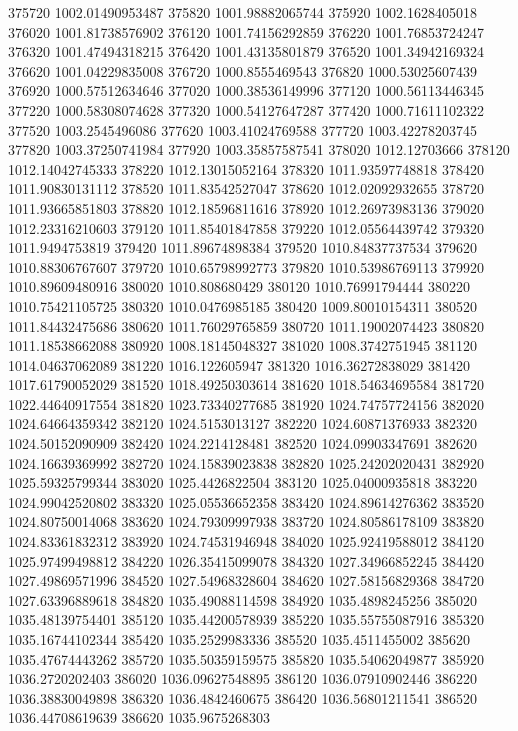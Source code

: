 {375720 1002.01490953487
375820 1001.98882065744
375920 1002.1628405018
376020 1001.81738576902
376120 1001.74156292859
376220 1001.76853724247
376320 1001.47494318215
376420 1001.43135801879
376520 1001.34942169324
376620 1001.04229835008
376720 1000.8555469543
376820 1000.53025607439
376920 1000.57512634646
377020 1000.38536149996
377120 1000.56113446345
377220 1000.58308074628
377320 1000.54127647287
377420 1000.71611102322
377520 1003.2545496086
377620 1003.41024769588
377720 1003.42278203745
377820 1003.37250741984
377920 1003.35857587541
378020 1012.12703666
378120 1012.14042745333
378220 1012.13015052164
378320 1011.93597748818
378420 1011.90830131112
378520 1011.83542527047
378620 1012.02092932655
378720 1011.93665851803
378820 1012.18596811616
378920 1012.26973983136
379020 1012.23316210603
379120 1011.85401847858
379220 1012.05564439742
379320 1011.9494753819
379420 1011.89674898384
379520 1010.84837737534
379620 1010.88306767607
379720 1010.65798992773
379820 1010.53986769113
379920 1010.89609480916
380020 1010.808680429
380120 1010.76991794444
380220 1010.75421105725
380320 1010.0476985185
380420 1009.80010154311
380520 1011.84432475686
380620 1011.76029765859
380720 1011.19002074423
380820 1011.18538662088
380920 1008.18145048327
381020 1008.3742751945
381120 1014.04637062089
381220 1016.122605947
381320 1016.36272838029
381420 1017.61790052029
381520 1018.49250303614
381620 1018.54634695584
381720 1022.44640917554
381820 1023.73340277685
381920 1024.74757724156
382020 1024.64664359342
382120 1024.5153013127
382220 1024.60871376933
382320 1024.50152090909
382420 1024.2214128481
382520 1024.09903347691
382620 1024.16639369992
382720 1024.15839023838
382820 1025.24202020431
382920 1025.59325799344
383020 1025.4426822504
383120 1025.04000935818
383220 1024.99042520802
383320 1025.05536652358
383420 1024.89614276362
383520 1024.80750014068
383620 1024.79309997938
383720 1024.80586178109
383820 1024.83361832312
383920 1024.74531946948
384020 1025.92419588012
384120 1025.97499498812
384220 1026.35415099078
384320 1027.34966852245
384420 1027.49869571996
384520 1027.54968328604
384620 1027.58156829368
384720 1027.63396889618
384820 1035.49088114598
384920 1035.4898245256
385020 1035.48139754401
385120 1035.44200578939
385220 1035.55755087916
385320 1035.16744102344
385420 1035.2529983336
385520 1035.4511455002
385620 1035.47674443262
385720 1035.50359159575
385820 1035.54062049877
385920 1036.2720202403
386020 1036.09627548895
386120 1036.07910902446
386220 1036.38830049898
386320 1036.4842460675
386420 1036.56801211541
386520 1036.44708619639
386620 1035.9675268303
}
